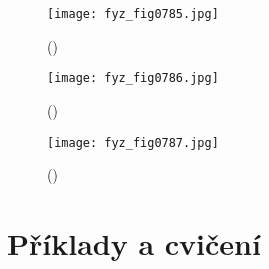     \begin{figure}[ht!] %
      \centering
      \texttt{[image: fyz\_fig0785.jpg]}
      \caption{
               (\cite[s.~707]{Feynman02})}
      \label{fyz:fig0785}
    \end{figure}

    \begin{figure}[ht!] %
      \centering
      \texttt{[image: fyz\_fig0786.jpg]}
      \caption{
               (\cite[s.~707]{Feynman02})}
      \label{fyz:fig0786}
    \end{figure}

    \begin{figure}[ht!] %
      \centering
      \texttt{[image: fyz\_fig0787.jpg]}
      \caption{
               (\cite[s.~707]{Feynman02})}
      \label{fyz:fig0787}
    \end{figure}


  \section{Příklady a cvičení}\label{fyz:IIchapXXXsecX}


